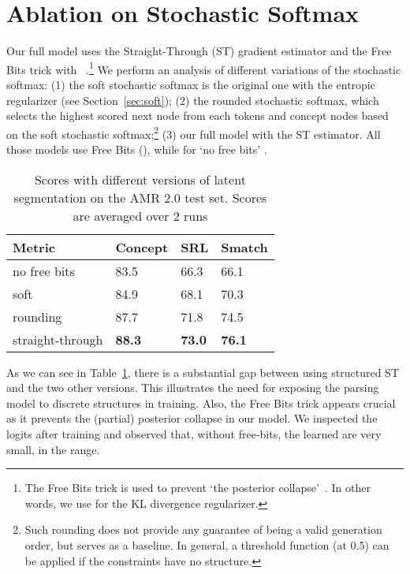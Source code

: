 \documentclass[11pt]{article}
\begin{document}
\section{Ablation on Stochastic Softmax}
Our full model uses the Straight-Through (ST) gradient estimator and the Free Bits trick with ~\cite{Kingma2017ImprovedVI}.\footnote{The Free Bits trick is used to prevent `the posterior collapse'~\cite{Kingma2017ImprovedVI}. In other words, we use  for the KL divergence regularizer.} 
We perform an analysis of different variations of the stochastic softmax:  (1)  the soft stochastic softmax is the original one with the entropic regularizer (see Section~\ref{sec:soft});  (2) the rounded stochastic softmax, which selects the highest scored next node from each tokens and concept nodes based on the soft stochastic softmax;\footnote{Such rounding does not provide any guarantee of being a valid generation order, but serves as a baseline. In general, a threshold function (at 0.5) can be applied if the constraints have no structure.} (3) our full model with the ST estimator.  All those models use Free Bits (),  while for `no free bits' . 
\begin{table}[t!] 
    \begin{center} 
        \begin{tabular}{llll} 
            \hline  Metric   &   Concept & SRL &  Smatch \\\hline
   no free bits  &  83.5  & 66.3 &  66.1 \\ 
           soft    & 84.9 & 68.1& 70.3\\
          rounding     & 87.7  &71.8& 74.5\\
          straight-through     &\bf  88.3 &\bf 73.0&\bf 76.1\\ \hline
        \end{tabular}
    \end{center}
    \vspace{-2ex}
	\caption{\label{table:ablation_ss} Scores with different versions of latent segmentation on the AMR 2.0 test set. Scores are averaged over 2 runs
    }
\end{table}
As we can see in Table~\ref{table:ablation_ss},  there is a substantial gap between using structured ST and the two other versions. This illustrates the need for exposing the parsing model to discrete structures in training. Also, the Free Bits trick appears crucial as it prevents the (partial) posterior collapse in our model. We inspected the logits after training and observed that, without free-bits, the learned  are very small, in the  range.   
\end{document}
